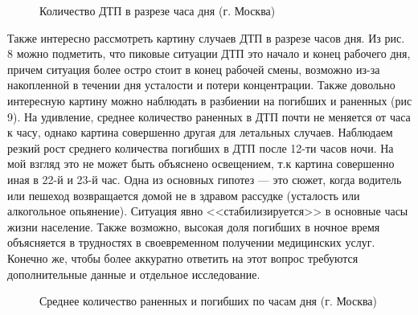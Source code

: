\documentclass[a4paper, 14pt]{article}
\begin{document}
\begin{figure}[h]
	\caption{Количество ДТП в разрезе часа дня (г. Москва)}
\end{figure}

Также интересно рассмотреть картину случаев ДТП в разрезе часов дня. Из рис. 8 можно подметить, что пиковые ситуации ДТП это начало и конец рабочего дня, причем ситуация более остро стоит в конец рабочей смены, возможно из-за накопленной в течении дня усталости и потери концентрации. Также довольно интересную картину можно наблюдать в разбиении на погибших и раненных (рис 9). На удивление, среднее количество раненных в ДТП почти не меняется от часа к часу, однако картина совершенно другая для летальных случаев. Наблюдаем резкий рост среднего количества погибших в ДТП после 12-ти часов ночи. На мой взгляд это не может быть объяснено освещением, т.к картина совершенно иная в 22-й и 23-й час. Одна из основных гипотез --- это сюжет, когда водитель или пешеход возвращается домой не в здравом рассудке (усталость или алкогольное опьянение). Ситуация явно <<стабилизируется>> в основные часы жизни население. Также возможно, высокая доля погибших в ночное время объясняется в трудностях в своевременном получении медицинских услуг. Конечно же, чтобы более аккуратно ответить на этот вопрос требуются дополнительные данные и отдельное исследование.

\begin{figure}[h]
	\caption{Среднее количество раненных и погибших по часам дня (г. Москва)}
\end{figure} 
\end{document}
